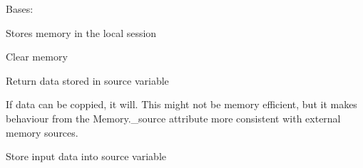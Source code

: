 \documentclass[letterpaper,10pt,english]{sphinxmanual}
\begin{document}

\begin{fulllineitems}
\label{\detokenize{dalio.base:dalio.base.memory.LocalMemory}}
Bases: {\hyperref[\detokenize{dalio.base:dalio.base.memory.Memory}]{}}

Stores memory in the local session

\begin{fulllineitems}
\label{\detokenize{dalio.base:dalio.base.memory.LocalMemory.clear}}
Clear memory

\end{fulllineitems}


\begin{fulllineitems}
\label{\detokenize{dalio.base:dalio.base.memory.LocalMemory.run}}
Return data stored in source variable

If data can be coppied, it will. This might not be memory efficient,
but it makes behaviour from the Memory.\_source attribute more
consistent with external memory sources.

\end{fulllineitems}


\begin{fulllineitems}
\label{\detokenize{dalio.base:dalio.base.memory.LocalMemory.set_input}}
Store input data into source variable

\end{fulllineitems}


\end{fulllineitems}
\end{document}
